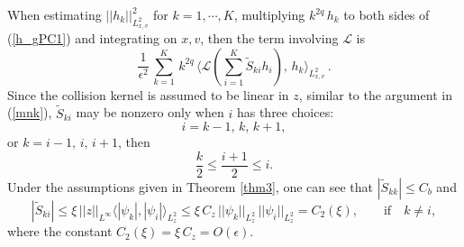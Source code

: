 \documentclass[final,onefignum,onetabnum]{siamart171218}
\begin{document}
When estimating $||h_k||_{L^2_{x,v}}^2$ for $k=1, \cdots, K$,  multiplying $k^{2q}\, h_k$ to both sides of (\ref{h_gPC1}) and integrating on $x, v$, then the term involving $\mathcal L$ is
\begin{equation}\label{L1}\frac{1}{\epsilon^2}\, \sum_{k=1}^{K}\, k^{2q}\, \langle\mathcal L(\sum_{i=1}^{K} \widetilde S_{ki}h_i), \, h_k\rangle_{L^2_{x,v}}\,. \end{equation}
Since the collision kernel is assumed to be linear in $z$, similar to the argument in (\ref{mnk}), $\widetilde S_{ki}$ may be nonzero only when $i$ has three choices:
$$i=k-1, \, k, \, k+1, $$
or $k=i-1, \, i, \, i+1$, then \begin{equation}\label{ki}\frac{k}{2}\leq \frac{i+1}{2}\leq i. \end{equation}
Under the assumptions given in Theorem \ref{thm3}, one can see that $|\widetilde S_{kk}|\leq C_b$ and
\begin{equation}\label{ski} |\widetilde S_{ki}| \leq \xi\, ||z||_{L^{\infty}}\langle |\psi_k|, |\psi_i|\rangle_{L_z^2}\leq \xi\, C_z\, ||\psi_k||_{L^2_z}\, ||\psi_i||_{L^2_z}
=C_2(\xi), \qquad\text{if}\quad  k\neq i,  \end{equation}
where the constant $C_2(\xi)=\xi\, C_z= O(\epsilon)$.
\end{document}
